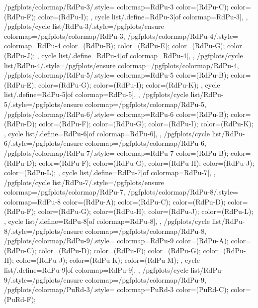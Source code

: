 {  %
  /pgfplots/colormap/RdPu-3/.style={
    colormap={RdPu-3}{
      color=(RdPu-C);
      color=(RdPu-F);
      color=(RdPu-I);
    },
    cycle list/.define={RdPu-3}{[of colormap=RdPu-3]},
  },
  /pgfplots/cycle list/RdPu-3/.style={/pgfplots/ensure colormap={/pgfplots/colormap/RdPu-3}},
  /pgfplots/colormap/RdPu-4/.style={
    colormap={RdPu-4}{
      color=(RdPu-B);
      color=(RdPu-E);
      color=(RdPu-G);
      color=(RdPu-J);
    },
    cycle list/.define={RdPu-4}{[of colormap=RdPu-4]},
  },
  /pgfplots/cycle list/RdPu-4/.style={/pgfplots/ensure colormap={/pgfplots/colormap/RdPu-4}},
  /pgfplots/colormap/RdPu-5/.style={
    colormap={RdPu-5}{
      color=(RdPu-B);
      color=(RdPu-E);
      color=(RdPu-G);
      color=(RdPu-I);
      color=(RdPu-K);
    },
    cycle list/.define={RdPu-5}{[of colormap=RdPu-5]},
  },
  /pgfplots/cycle list/RdPu-5/.style={/pgfplots/ensure colormap={/pgfplots/colormap/RdPu-5}},
  /pgfplots/colormap/RdPu-6/.style={
    colormap={RdPu-6}{
      color=(RdPu-B);
      color=(RdPu-D);
      color=(RdPu-F);
      color=(RdPu-G);
      color=(RdPu-I);
      color=(RdPu-K);
    },
    cycle list/.define={RdPu-6}{[of colormap=RdPu-6]},
  },
  /pgfplots/cycle list/RdPu-6/.style={/pgfplots/ensure colormap={/pgfplots/colormap/RdPu-6}},
  /pgfplots/colormap/RdPu-7/.style={
    colormap={RdPu-7}{
      color=(RdPu-B);
      color=(RdPu-D);
      color=(RdPu-F);
      color=(RdPu-G);
      color=(RdPu-H);
      color=(RdPu-J);
      color=(RdPu-L);
    },
    cycle list/.define={RdPu-7}{[of colormap=RdPu-7]},
  },
  /pgfplots/cycle list/RdPu-7/.style={/pgfplots/ensure colormap={/pgfplots/colormap/RdPu-7}},
  /pgfplots/colormap/RdPu-8/.style={
    colormap={RdPu-8}{
      color=(RdPu-A);
      color=(RdPu-C);
      color=(RdPu-D);
      color=(RdPu-F);
      color=(RdPu-G);
      color=(RdPu-H);
      color=(RdPu-J);
      color=(RdPu-L);
    },
    cycle list/.define={RdPu-8}{[of colormap=RdPu-8]},
  },
  /pgfplots/cycle list/RdPu-8/.style={/pgfplots/ensure colormap={/pgfplots/colormap/RdPu-8}},
  /pgfplots/colormap/RdPu-9/.style={
    colormap={RdPu-9}{
      color=(RdPu-A);
      color=(RdPu-C);
      color=(RdPu-D);
      color=(RdPu-F);
      color=(RdPu-G);
      color=(RdPu-H);
      color=(RdPu-J);
      color=(RdPu-K);
      color=(RdPu-M);
    },
    cycle list/.define={RdPu-9}{[of colormap=RdPu-9]},
  },
  /pgfplots/cycle list/RdPu-9/.style={/pgfplots/ensure colormap={/pgfplots/colormap/RdPu-9}},
  /pgfplots/colormap/PuRd-3/.style={
    colormap={PuRd-3}{
      color=(PuRd-C);
      color=(PuRd-F);
}}}
